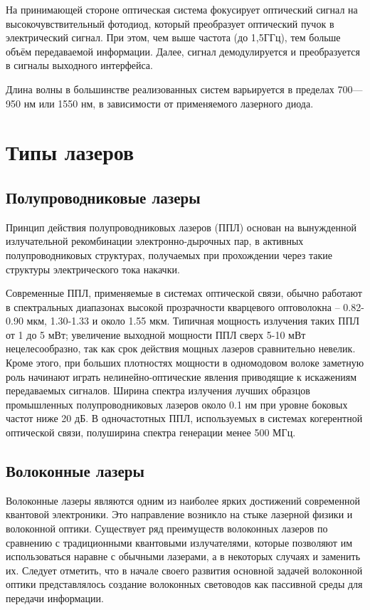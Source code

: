 \documentclass[14pt,pscyr,titlepage]{hedreport}
\begin{document}
		На принимающей стороне оптическая система фокусирует оптический сигнал 
		на высокочувствительный фотодиод, который преобразует оптический пучок 
		в электрический сигнал. При этом, чем выше частота (до 1,5ГГц), 
		тем больше объём передаваемой информации. Далее, сигнал демодулируется 
		и преобразуется в сигналы выходного интерфейса.

		Длина волны в большинстве реализованных систем варьируется в пределах 
		700—950 нм или 1550 нм, в зависимости от применяемого лазерного диода.

	\section{Типы лазеров}
	\subsection{Полупроводниковые лазеры}
		Принцип действия полупроводниковых лазеров (ППЛ) основан на 
		вынужденной излучательной рекомбинации электронно-дырочных пар, в 
		активных полупроводниковых структурах, получаемых при прохождении 
		через такие структуры электрического тока накачки. 

		Современные ППЛ, применяемые в системах оптической связи, обычно 
		работают в спектральных диапазонах высокой прозрачности кварцевого 
		оптоволокна -- 0.82-0.90 мкм, 1.30-1.33 и около 1.55 мкм. Типичная 
		мощность излучения таких ППЛ от 1 до 5 мВт; увеличение выходной 
		мощности ППЛ сверх 5-10 мВт нецелесообразно, так как срок действия 
		мощных лазеров сравнительно невелик. Кроме этого, при больших 
		плотностях мощности в одномодовом волоке заметную роль начинают 
		играть нелинейно-оптические явления приводящие к искажениям 
		передаваемых сигналов. Ширина спектра излучения лучших образцов 
		промышленных полупроводниковых лазеров около 0.1 нм при уровне 
		боковых частот ниже 20 дБ. В одночастотных ППЛ, используемых в 
		системах когерентной оптической связи, полуширина спектра генерации 
		менее 500 МГц. 

	\subsection{Волоконные лазеры}
		Волоконные лазеры являются одним из наиболее ярких достижений 
		современной квантовой электроники. Это направление возникло на стыке 
		лазерной физики и волоконной оптики. Существует ряд преимуществ 
		волоконных лазеров по сравнению с традиционными квантовыми 
		излучателями, которые позволяют им использоваться наравне с обычными 
		лазерами, а в некоторых случаях и заменить их. Следует отметить, что 
		в начале своего развития основной задачей волоконной оптики 
		представлялось создание волоконных световодов как пассивной среды для 
		передачи информации.
\end{document}
